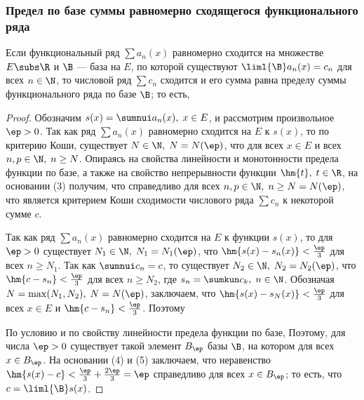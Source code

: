 \documentclass[a4paper]{article}
\begin{document}
\subsubsection{Предел по базе суммы равномерно сходящегося функционального ряда}

\begin{theorem}
Если функциональный ряд $\sum a_n(x)$ равномерно сходится на
множестве $E\subs\R$ и $\B$ --- база на $E$, по которой существуют
$\liml{\B}a_n(x)=c_n$ для всех $n\in\N$, то числовой ряд $\sum c_n$
сходится и его сумма равна пределу суммы функционального ряда по
базе $\B$; то есть, 
\end{theorem}

\begin{proof}
Обозначим $s(x) = \sumnui a_n(x), \; x\in E$, и рассмотрим
произвольное $\ep>0$. Так как ряд $\sum a_n(x)$ равномерно сходится
на $E$ к $s(x)$, то по критерию Коши, существует $N\in\N, \;
N=N(\ep)$, что 
для всех $x\in E$ и всех $n,p\in\N, \; n\ge N$. Опираясь на свойства
линейности и монотонности предела функции по базе, а также на
свойство непрерывности функции $\hm{t}, \; t\in\R$, на основании (3)
получим, что  справедливо для всех $n,p\in\N, \; n\ge
N=N(\ep)$, что является критерием Коши сходимости числового ряда
$\sum c_n$ к некоторой сумме $c$.

Так как ряд $\sum a_n(x)$ равномерно сходится на $E$ к функции
$s(x)$, то для $\ep>0$ существует $N_1\in\N, \; N_1=N_1(\ep)$, что
$\hm{s(x)-s_n(x)}<\frac{\ep}3$ для всех $n\ge N_1$. Так как $\sumnui
c_n=c$, то существует $N_2\in\N, \; N_2=N_2(\ep)$, что
$\hm{c-s_n}<\frac{\ep}3$ для всех $n\ge N_2$, где $s_n = \sumkun
c_k, \; n\in\N$. Обозначая $N=\max(N_1,N_2), \; N=N(\ep)$,
заключаем, что $\hm{s(x) - s_N(x)} < \frac{\ep}3$ для всех $x\in E$
и $\hm{c-s_n}<\frac{\ep}3$. Поэтому 

По условию и по свойству линейности предела функции по базе,
Поэтому, для числа $\ep>0$ существует такой элемент $B_{\ep}$ базы
$\B$, на котором  для всех
$x\in B_{\ep}$. На основании (4) и (5) заключаем, что неравенство
$\hm{s(x)-c}<\frac{\ep}3 + \frac{2\ep}3 = \ep$ справедливо для всех
$x\in B_{\ep}$; то есть, что $c = \liml{\B}s(x)$.
\end{proof}
\end{document}
